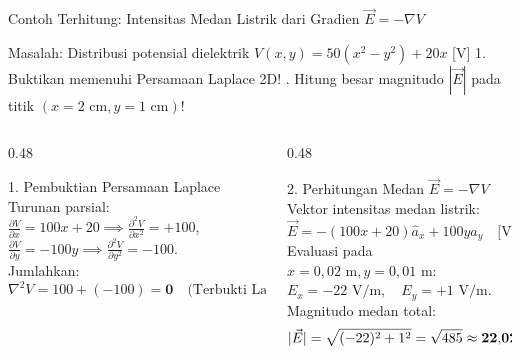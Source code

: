 \documentclass[aspectratio=169,10pt]{beamer}
\begin{document}
\begin{frame}{Contoh Terhitung: Intensitas Medan Listrik dari Gradien $\vec{E} = -\nabla V$}
  \begin{exampleblock}{Masalah: Distribusi potensial dielektrik $V(x, y) = 50(x^2 - y^2) + 20x$ [V]}
    1. Buktikan memenuhi Persamaan Laplace 2D! . Hitung besar magnitudo $|\vec{E}|$ pada titik $(x = 2\text{ cm}, y = 1\text{ cm})$!
  \end{exampleblock}
  \begin{columns}[t]
    \begin{column}{0.48\textwidth}
      \begin{block}{1. Pembuktian Persamaan Laplace}
        \small
        Turunan parsial:
        $\frac{\partial V}{\partial x} = 100x + 20 \implies \frac{\partial^2 V}{\partial x^2} = +100$,\\
        $\frac{\partial V}{\partial y} = -100y \implies \frac{\partial^2 V}{\partial y^2} = -100$.\\[2pt]
        Jumlahkan:
        \begin{equation*}
          \nabla^2 V = 100 + (-100) = \mathbf{0} \quad \text{(Terbukti Laplace!)}
        \end{equation*}
      \end{block}
    \end{column}
    \begin{column}{0.48\textwidth}
      \begin{alertblock}{2. Perhitungan Medan $\vec{E} = -\nabla V$}
        \small
        Vektor intensitas medan listrik:
        \begin{equation*}
          \vec{E} = -(100x + 20)\hat{a}_x + 100y\hat{a}_y \quad \text{[V/m]}
        \end{equation*}
        Evaluasi pada $x = 0{,}02\text{ m}, y = 0{,}01\text{ m}$:
        $E_x = -22\text{ V/m}, \quad E_y = +1\text{ V/m}$.\\[2pt]
        Magnitudo medan total:
        \begin{equation*}
          |\vec{E}| = \sqrt{(-22)^2 + 1^2} = \sqrt{485} \approx \mathbf{22{,}02\text{ V/m}} \quad \qed
        \end{equation*}
      \end{alertblock}
    \end{column}
  \end{columns}
\end{frame}
\end{document}
